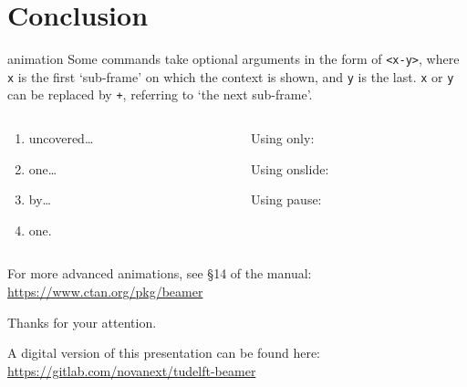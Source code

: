 \section{Conclusion}
\begin{frame}[fragile]{animation}
  \vfill
  Some commands take optional arguments in the form of \verb|<x-y>|,
  where \verb|x| is the first `sub-frame' on which the context is shown,
  and \verb|y| is the last. \verb|x| or \verb|y| can be replaced by \verb|+|,
  referring to `the next sub-frame'. 
  \vfill
  \begin{columns}[onlytextwidth]
  \begin{column}{.5\textwidth}
    \begin{enumerate}
      \item<+-> uncovered\ldots
      \item<+-> one\ldots
      \item<+-> by\ldots
      \item<+-> one.
    \end{enumerate}
    \end{column}
  \begin{column}{.5\textwidth}
      Using only:

      Using onslide:

      Using pause:
  \end{column}
  \end{columns}
  \vfill
  For more advanced animations, see \S 14 of the manual:\\
  \url{https://www.ctan.org/pkg/beamer}
  \vfill
\end{frame}

\begin{frame}
  Thanks for your attention.

  A digital version of this presentation can be found here:
  \vfill
  \url{https://gitlab.com/novanext/tudelft-beamer} 
  \vfill  
  \centering
  \vfill
\end{frame}


\begin{frame}[allowframebreaks,t]{\bibname}
	\AtNextBibliography{\footnotesize}%
	\printbibliography
\end{frame}


